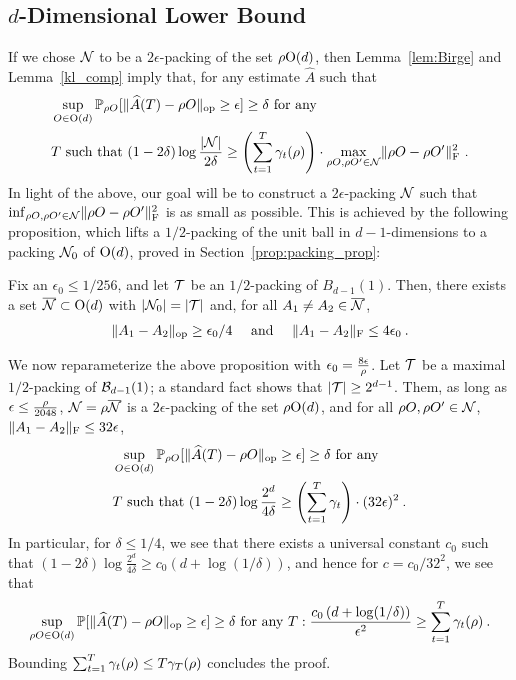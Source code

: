 \subsection{$d$-Dimensional Lower Bound}
If we chose $\mathcal{N}$ to be a $2\epsilon$-packing of the set $\rho\mathrm{O}(d)$, then Lemma~\ref{lem:Birge} and Lemma~\ref{kl_comp} imply that, for any estimate $\widehat{A}$ such that
\begin{eqnarray*}
&\sup_{ O \in \mathrm{O}(d)}\mathbb{P}_{\rho O}[\|\widehat{A}(T) - \rho O\|_{\mathrm{op}} \ge \epsilon] \ge \delta \text{ for any } \\
&T \text{ such that } (1-2\delta)\log \frac{|\mathcal{N}|}{2\delta} \ge \left(\sum_{t=1}^T \gamma_{t}(\rho)\right) \cdot \max_{\rho O,\rho O' \in \mathcal{N}}\lVert \rho O - \rho O' \rVert_{\mathrm{F}}^2~.
\end{eqnarray*}
In light of the above, our goal will be to construct a $2\epsilon$-packing $\mathcal{N}$ such that $\inf_{\rho O,\rho O' \in \mathcal{N}}\lVert \rho O - \rho O' \rVert_{\mathrm{F}}^2$ is as small as possible. This is achieved by the following proposition, which lifts a $1/2$-packing of the unit ball in $d-1$-dimensions to a packing $\mathcal{N}_0$ of $\mathrm{O}(d)$, proved in Section~\ref{prop:packing_prop}:
\begin{prop}\label{prop:packing_prop} Fix an $\epsilon_0 \le 1/256$, and let $\mathcal{T}$ be an $1/2$-packing of $B_{d-1}(1)$. Then, there exists a set $\overline{\mathcal{N}} \subset \mathrm{O}(d)$ with $|\mathcal{N}_0| = |\mathcal{T}|$ and, for all $A_1 \ne A_2 \in \overline{\mathcal{N}}$,
\begin{eqnarray}
\lVert A_1-A_2 \rVert_{\mathrm{op}} \ge \epsilon_0 /4 \quad \text{ and } \quad \lVert A_1-A_2 \rVert_{\mathrm{F}} \le 4\epsilon_0 \:.
\end{eqnarray}
\end{prop}
We now reparameterize the above proposition with $\epsilon_0 = \frac{8\epsilon}{\rho}$. Let $\mathcal{T}$ be a maximal $1/2$-packing of $\mathcal{B}_{d-1}(1)$; a standard fact shows that $|\mathcal{T}| \ge 2^{d-1}$. Them, as long as $\epsilon \le \frac{\rho}{2048}$, $\mathcal{N} = \rho \overline{\mathcal{N}}$ is a $2\epsilon$-packing of the set $\rho \mathrm{O}(d)$, and for all $\rho O, \rho O' \in \mathcal{N}$, $\lVert A_1-A_2 \rVert_{\mathrm{F}} \le 32\epsilon$,
\begin{eqnarray*}
&\sup_{O \in \mathrm{O}(d)}\mathbb{P}_{\rho O}[\|\widehat{A}(T) - \rho O\|_{\mathrm{op}} \ge \epsilon] \ge \delta \text{ for any } \\
&T \text{ such that } (1-2\delta)\log \frac{2^d}{4\delta} \ge \left(\sum_{t=1}^T \gamma_t \right) \cdot (32\epsilon)^{2} \:.
\end{eqnarray*}
In particular, for $\delta \le 1/4$, we see that there exists a universal constant $c_0$ such that $(1-2\delta)\log \frac{2^d}{4\delta} \ge c_0(d + \log (1/\delta))$, and hence for $c = c_0/32^2$, we see that
\begin{eqnarray*}
\sup_{\rho O \in \mathrm{O}(d)}\mathbb{P}[\|\widehat{A}(T) - \rho O\|_{\mathrm{op}} \ge \epsilon] \ge \delta \text{ for any } T: \frac{c_0 \left( d + \log(1/\delta)\right)}{\epsilon^2} \ge \sum_{t=1}^T \gamma_{t}(\rho) \:.
\end{eqnarray*}
Bounding $\sum_{t=1}^T \gamma_{t}(\rho) \le T \gamma_{T}(\rho)$ concludes the proof.
